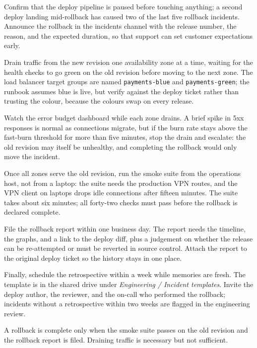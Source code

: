 \documentclass[11pt]{article}
\begin{document}
\begin{tcolorbox}[breakable, title=Rollback checklist (v14)]
Confirm that the deploy pipeline is paused before touching anything;
a second deploy landing mid-rollback has caused two of the last five
rollback incidents. Announce the rollback in the incidents channel
with the release number, the reason, and the expected duration, so
that support can set customer expectations early.

Drain traffic from the new revision one availability zone at a time,
waiting for the health checks to go green on the old revision before
moving to the next zone. The load balancer target groups are named
\texttt{payments-blue} and \texttt{payments-green}; the runbook
assumes blue is live, but verify against the deploy ticket rather
than trusting the colour, because the colours swap on every release.

Watch the error budget dashboard while each zone drains. A brief
spike in 5xx responses is normal as connections migrate, but if the
burn rate stays above the fast-burn threshold for more than five
minutes, stop the drain and escalate: the old revision may itself be
unhealthy, and completing the rollback would only move the incident.

Once all zones serve the old revision, run the smoke suite from the
operations host, not from a laptop: the suite needs the production
VPN routes, and the VPN client on laptops drops idle connections
after fifteen minutes. The suite takes about six minutes; all
forty-two checks must pass before the rollback is declared complete.

File the rollback report within one business day. The report needs
the timeline, the graphs, and a link to the deploy diff, plus a
judgement on whether the release can be re-attempted or must be
reverted in source control. Attach the report to the original deploy
ticket so the history stays in one place.

Finally, schedule the retrospective within a week while memories are
fresh. The template is in the shared drive under \emph{Engineering /
Incident templates}. Invite the deploy author, the reviewer, and the
on-call who performed the rollback; incidents without a
retrospective within two weeks are flagged in the engineering review.
\end{tcolorbox}

\begin{keypoint}
A rollback is complete only when the smoke suite passes on the old
revision and the rollback report is filed. Draining traffic is
necessary but not sufficient.
\end{keypoint}
\end{document}
